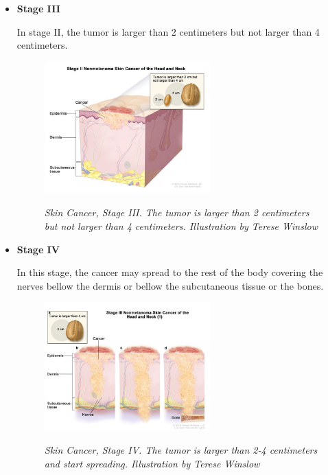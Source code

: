 \begin{itemize}
 \item \textbf{Stage III}

In stage II, the tumor is larger than 2 centimeters but not larger than 4 centimeters.

\begin{figure}[H]
\centering
\includegraphics[width=0.6\textwidth]{imatges/problem_domain/stage2-skin-cancer.jpg}
\caption[Skin Cancer, Stage III]{\textit{Skin Cancer, Stage III. The tumor is larger than 2 centimeters but not larger than 4 centimeters. Illustration by Terese Winslow}}
{\label{fig:stage2-skin-canceer}}
\end{figure}

\newpage

\item \textbf{Stage IV}

In this stage, the cancer may spread to the rest of the body covering the nerves bellow the dermis or bellow the subcutaneous tissue or the bones.

\begin{figure}[H]
\centering
\includegraphics[width=0.6\textwidth]{imatges/problem_domain/stage3-skin-cancer.jpg}
\caption[Skin Cancer, Stage IV]{\textit{Skin Cancer, Stage IV. The tumor is larger than 2-4 centimeters and start spreading. Illustration by Terese Winslow}}
{\label{fig:stage3-skin-canceer}}
\end{figure}

\end{itemize}

